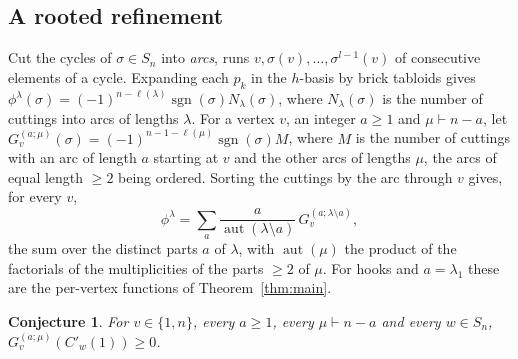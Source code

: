 \documentclass[11pt]{amsart}
\newtheorem{conjecture}[theorem]{Conjecture}
\theoremstyle{definition}
\theoremstyle{remark}
\newcommand{\sgn}{\operatorname{sgn}}
\newcommand{\Cp}[1]{C'_{#1}(1)}
\begin{document}
\subsection{A rooted refinement}
Cut the cycles of $\sigma\in S_n$ into \emph{arcs}, runs $v,\sigma(v),\dots,\sigma^{l-1}(v)$ of consecutive elements of a cycle. Expanding each $p_k$ in the $h$-basis by brick tabloids gives $\phi^\lambda(\sigma)=(-1)^{n-\ell(\lambda)}\sgn(\sigma)N_\lambda(\sigma)$, where $N_\lambda(\sigma)$ is the number of cuttings into arcs of lengths $\lambda$. For a vertex $v$, an integer $a\ge1$ and $\mu\vdash n-a$, let
$G^{(a;\mu)}_v(\sigma)=(-1)^{n-1-\ell(\mu)}\sgn(\sigma)M$, where $M$ is the number of cuttings with an arc of length $a$ starting at $v$ and the other arcs of lengths $\mu$, the arcs of equal length $\ge2$ being ordered. Sorting the cuttings by the arc through $v$ gives, for every $v$,
\[
\phi^\lambda=\sum_{a}\frac{a}{\operatorname{aut}(\lambda\setminus a)}\,G^{(a;\lambda\setminus a)}_v,
\]
the sum over the distinct parts $a$ of $\lambda$, with $\operatorname{aut}(\mu)$ the product of the factorials of the multiplicities of the parts $\ge2$ of $\mu$. For hooks and $a=\lambda_1$ these are the per-vertex functions of Theorem~\ref{thm:main}.

\begin{conjecture}\label{conj:rooted}
For $v\in\{1,n\}$, every $a\ge1$, every $\mu\vdash n-a$ and every $w\in S_n$, $G^{(a;\mu)}_v(\Cp w)\ge0$.
\end{conjecture}
\end{document}
